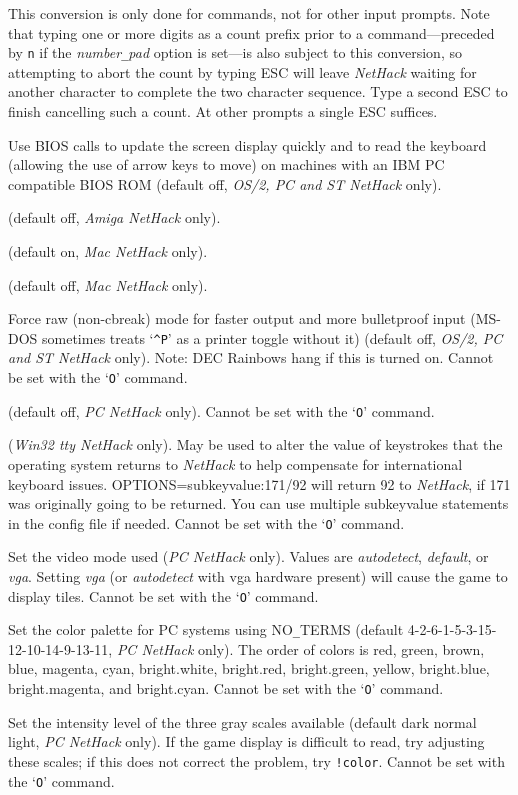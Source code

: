 This conversion is only done for commands, not for other input prompts.
Note that typing one or more digits as a count prefix prior to a
command---preceded by {\tt n} if the {\it number\verb+_+pad\/}
option is set---is also subject to this conversion, so attempting to
abort the count by typing ESC will leave {\it NetHack\/} waiting for another
character to complete the two character sequence.  Type a second ESC to
finish cancelling such a count.  At other prompts a single ESC suffices.
\item[\ib{BIOS}]
Use BIOS calls to update the screen display quickly and to read the keyboard
(allowing the use of arrow keys to move) on machines with an IBM PC
compatible BIOS ROM (default off, {\it OS/2, PC\/ {\rm and} ST NetHack\/} only).
\item[\ib{flush}]
(default off, {\it Amiga NetHack \/} only).
\item[\ib{Macgraphics}]
(default on, {\it Mac NetHack \/} only).
\item[\ib{page\verb+_+wait}]
(default off, {\it Mac NetHack \/} only).
\item[\ib{rawio}]
Force raw (non-cbreak) mode for faster output and more
bulletproof input (MS-DOS sometimes treats `{\tt \^{}P}' as a printer toggle
without it) (default off, {\it OS/2, PC\/ {\rm and} ST NetHack\/} only).
Note:  DEC Rainbows hang if this is turned on.
Cannot be set with the `{\tt O}' command.
\item[\ib{soundcard}]
(default off, {\it PC NetHack \/} only).
Cannot be set with the `{\tt O}' command.
\item[\ib{subkeyvalue}]
({\it Win32 tty NetHack \/} only).
May be used to alter the value of keystrokes that the operating system
returns to {\it NetHack\/} to help compensate for international keyboard
issues.
OPTIONS=subkeyvalue:171/92
will return 92 to {\it NetHack\/}, if 171 was originally going to be returned.
You can use multiple subkeyvalue statements in the config file if needed.
Cannot be set with the `{\tt O}' command.
\item[\ib{video}]
Set the video mode used ({\it PC\/ NetHack\/} only).
Values are {\it autodetect\/}, {\it default\/}, or {\it vga\/}.
Setting {\it vga\/} (or {\it autodetect\/} with vga hardware present) will
cause the game to display tiles.
Cannot be set with the `{\tt O}' command.
\item[\ib{videocolors}]
\begin{sloppypar}
Set the color palette for PC systems using NO\verb+_+TERMS
(default 4-2-6-1-5-3-15-12-10-14-9-13-11, {\it PC\/ NetHack\/} only).
The order of colors is red, green, brown, blue, magenta, cyan,
bright.white, bright.red, bright.green, yellow, bright.blue,
bright.magenta, and bright.cyan.
Cannot be set with the `{\tt O}' command.
\end{sloppypar}
\item[\ib{videoshades}]
Set the intensity level of the three gray scales available
(default dark normal light, {\it PC\/ NetHack\/} only).
If the game display is difficult to read, try adjusting these scales;
if this does not correct the problem, try {\tt !color}.
Cannot be set with the `{\tt O}' command.
\elist

